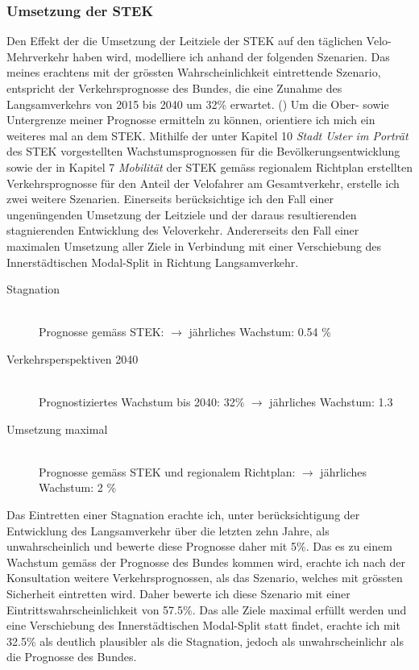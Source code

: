 \subsubsection*{Umsetzung der STEK}
\label{subsubsec:Umsetzung}


Den Effekt der die Umsetzung der Leitziele der STEK auf den täglichen Velo-Mehrverkehr haben wird, modelliere ich anhand der folgenden Szenarien. Das meines erachtens mit der grössten Wahrscheinlichkeit eintrettende Szenario, entspricht der Verkehrsprognosse des Bundes, die eine Zunahme des Langsamverkehrs von 2015 bis 2040 um 32\% erwartet. (\cite{Perspektive2040}) 
Um die Ober- sowie Untergrenze meiner Prognosse ermitteln zu können, orientiere ich mich ein weiteres mal an dem STEK. Mithilfe der unter Kapitel 10 \textit{Stadt Uster im Porträt} des STEK vorgestellten Wachstumsprognossen für die Bevölkerungsentwicklung sowie der in Kapitel 7 \textit{Mobilität} der STEK gemäss regionalem Richtplan erstellten Verkehrsprognosse für den Anteil der Velofahrer am Gesamtverkehr, erstelle ich zwei weitere Szenarien. 
Einerseits berücksichtige ich den Fall einer ungenüngenden Umsetzung der Leitziele und der daraus resultierenden stagnierenden Entwicklung des Veloverkehr. Andererseits den Fall einer maximalen Umsetzung aller Ziele in Verbindung mit einer Verschiebung des Innerstädtischen Modal-Split in Richtung Langsamverkehr.

\begin{description}
\item[Stagnation] \hfill \\
Prognosse gemäss STEK: $\rightarrow$ jährliches Wachstum: 0.54 \% 
\item[Verkehrsperspektiven 2040] \hfill \\
Prognostiziertes Wachstum bis 2040: 32\% $\rightarrow$ jährliches Wachstum: 1.3 
\item[Umsetzung maximal] \hfill \\
Prognosse gemäss STEK und regionalem Richtplan: $\rightarrow$ jährliches Wachstum: 2 \% 
\end{description}

Das Eintretten einer Stagnation erachte ich, unter berücksichtigung der Entwicklung des Langsamverkehr über die letzten zehn Jahre, als unwahrscheinlich und bewerte diese Prognosse daher mit 5\%.
Das es zu einem Wachstum gemäss der Prognosse des Bundes kommen wird, erachte ich nach der Konsultation weitere Verkehrsprognossen, als das Szenario, welches mit grössten Sicherheit eintretten wird. Daher bewerte ich diese Szenario mit einer Eintrittswahrscheinlichkeit von 57.5\%. 
Das alle Ziele maximal erfüllt werden und eine Verschiebung des Innerstädtischen Modal-Split statt findet, erachte ich mit 32.5\% als deutlich plausibler als die Stagnation, jedoch als unwahrscheinlichr als die Prognosse des Bundes. 


